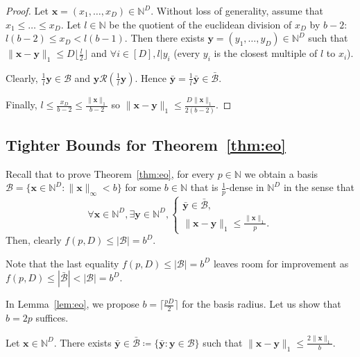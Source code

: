 \begin{proof}
     Let $\mathbf x=(x_1,\ldots,x_D)\in\mathbb N^D$. Without loss of generality, assume that $x_1\le\ldots\le x_D$. Let $l\in\mathbb N$ be the quotient of the euclidean division of $x_D$ by $b-2$: $l(b-2)\le x_D<l(b-1)$. Then there exists $\mathbf y=(y_1,\ldots,y_D)\in\mathbb N^D$ such that $\|\mathbf x-\mathbf y\|_1\le D\big\lfloor\frac l2\big\rfloor$ and $\forall i\in[D],l|y_i$ (every $y_i$ is the closest multiple of $l$ to $x_i$). 

     Clearly, $\frac1l\mathbf y\in\mathcal B$ and ${\mathbf y}\mathcal R(\frac1l{\mathbf y})$. Hence $\bar{\mathbf y}=\frac1l\bar{\mathbf y}\in\bar{\mathcal B}$.

     Finally, $l\le\frac{x_D}{b-2}\le\frac{\|\mathbf x\|_1}{b-2}$ so $\|\mathbf x-\mathbf y\|_1\le\frac{D\|\mathbf x\|_1}{2(b-2)}$.
\end{proof}

\subsection{Tighter Bounds for Theorem~\ref{thm:eo}}

\thmeo*

Recall that to prove Theorem~\ref{thm:eo}, for every $p\in\mathbb N$ we obtain a basis $\mathcal B=\{\mathbf x\in\mathbb N^D\colon\|\mathbf x\|_\infty<b\}$ for some $b\in\mathbb N$ that is $\frac1p$-dense in $\mathbb N^D$ in the sense that
\[\forall\mathbf x\in\mathbb N^D,\exists\mathbf y\in\mathbb N^D,\begin{cases}
\bar{\mathbf y}\in\bar{\mathcal B},\\
\|\mathbf x-\mathbf y\|_1\leq\frac{\|\mathbf x\|_1}p.
\end{cases}\]
Then, clearly $f(p,D)\leq|\mathcal B|=b^D$.

\begin{remark}
    Note that the last equality $f(p,D)\leq|\mathcal B|=b^D$ leaves room for improvement as $f(p,D)\leq|\bar{\mathcal B}|<|\mathcal B|=b^D$.
\end{remark}

In Lemma~\ref{lem:eo}, we propose $b=\big\lceil\frac {pD}2\big\rceil$ for the basis radius. Let us show that $b=2p$ suffices.

\begin{lemma}
    Let $\mathbf x\in\mathbb N^D$. There exists $\bar{\mathbf y}\in\bar{\mathcal B}\coloneqq\{\bar{\mathbf y}\colon\mathbf y\in\mathcal B\}$ such that $\|\mathbf x-\mathbf y\|_1\leq \frac{2\|\mathbf x\|_1}{b}$.
\end{lemma}

